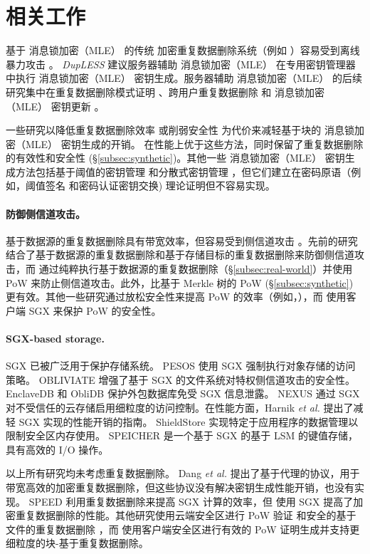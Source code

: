 \section{相关工作}
\label{sec:related_work}

 基于 消息锁加密（MLE） 的传统 \cite{bellare13a} 加密重复数据删除系统（例如 \cite{adya02,cox02,shah15}）容易受到离线暴力攻击 \cite{bellare13b}。 {\em DupLESS} \cite{bellare13b} 建议服务器辅助 消息锁加密（MLE） 在专用密钥管理器中执行 消息锁加密（MLE） 密钥生成。服务器辅助 消息锁加密（MLE） 的后续研究集中在重复数据删除模式证明 \cite{armknecht15}、跨用户重复数据删除 \cite{zhou15} 和 消息锁加密（MLE） 密钥更新 \cite{qin17}。

一些研究以降低重复数据删除效率 \cite{zhou15,qin17} 或削弱安全性 \cite{li20a} 为代价来减轻基于块的 消息锁加密（MLE） 密钥生成的开销。 \sysnameS 在性能上优于这些方法，同时保留了重复数据删除的有效性和安全性 (\S\ref{subsec:synthetic})。其他一些 消息锁加密（MLE） 密钥生成方法包括基于阈值的密钥管理 \cite{duan14} 和分散式密钥管理 \cite{liu15}，但它们建立在密码原语（例如，阈值签名 \cite{duan14} 和密码认证密钥交换\cite{liu15}) 理论证明但不容易实现。

\paragraph{防御侧信道攻击。} 基于数据源的重复数据删除具有带宽效率，但容易受到侧信道攻击 \cite{harnik10}。先前的研究 \cite{harnik10, li15} 结合了基于数据源的重复数据删除和基于存储目标的重复数据删除来防御侧信道攻击，而 \sysnameS 通过纯粹执行基于数据源的重复数据删除（\S\ref{subsec:real-world}）并使用 PoW 来防止侧信道攻击。此外，\sysnameS 比基于 Merkle 树的 PoW (\S\ref{subsec:synthetic}) 更有效。其他一些研究通过放松安全性来提高 PoW 的效率（例如，\cite{pietro12,xu13}），而 \sysnameS 使用客户端 SGX 来保护 PoW 的安全性。

\paragraph{SGX-based storage.} SGX \cite{sgx} 已被广泛用于保护存储系统。 PESOS \cite{krahn18} 使用 SGX 强制执行对象存储的访问策略。 OBLIVIATE \cite{ahmad18} 增强了基于 SGX 的文件系统对特权侧信道攻击的安全性。 EnclaveDB \cite{priebe18} 和 ObliDB \cite{eskandarian19} 保护外包数据库免受 SGX 信息泄露。 NEXUS \cite{djoko19} 通过 SGX 对不受信任的云存储启用细粒度的访问控制。在性能方面，Harnik \textit{ et al.} \cite{harnik18} 提出了减轻 SGX 实现的性能开销的指南。 ShieldStore \cite{kim19} 实现特定于应用程序的数据管理以限制安全区内存使用。 SPEICHER \cite{bailleu19} 是一个基于 SGX 的基于 LSM 的键值存储，具有高效的 I/O 操作。

以上所有研究均未考虑重复数据删除。 Dang \textit{ et al.} \cite{dang17} 提出了基于代理的协议，用于带宽高效的加密重复数据删除，但这些协议没有解决密钥生成性能开销，也没有实现。 SPEED \cite{cui19} 利用重复数据删除来提高 SGX 计算的效率，但 \sysnameS 使用 SGX 提高了加密重复数据删除的性能。其他研究使用云端安全区进行 PoW 验证 \cite{you20} 和安全的基于文件的重复数据删除 \cite{fuhry20}，而 \sysnameS 使用客户端安全区进行有效的 PoW 证明生成并支持更细粒度的块-基于重复数据删除。
